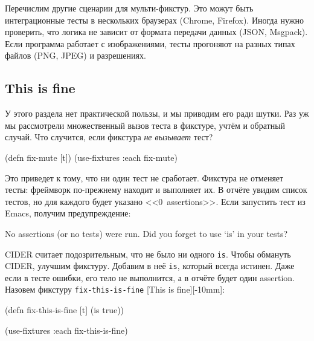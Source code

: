 Перечислим другие сценарии для мульти-фикстур. Это можут быть интеграционные
тесты в нескольких браузерах (Chrome, Firefox). Иногда нужно проверить, что
логика не зависит от формата передачи данных (JSON, Msgpack). Если программа
работает с изображениями, тесты прогоняют на разных типах файлов (PNG, JPEG) и
разрешениях.

\subsection{This is fine}

У этого раздела нет практической пользы, и мы приводим его ради шутки. Раз уж мы
рассмотрели множественный вызов теста в фикстуре, учтём и обратный случай. Что
случится, если фикстура \emph{не вызывает} тест?


\begin{english}
  \begin{clojure}
(defn fix-mute [t])
(use-fixtures :each fix-mute)
  \end{clojure}
\end{english}

Это приведет к тому, что ни один тест не сработает. Фикстура не отменяет тесты:
фреймворк по-прежнему находит и выполняет их. В отчёте увидим список тестов,
но для каждого будет указано <<0~assertions>>. Если запустить тест из Emacs,
получим предупреждение:

\begin{english}
  \begin{clojure}
No assertions (or no tests) were run.
Did you forget to use ‘is’ in your tests?
  \end{clojure}
\end{english}


CIDER считает подозрительным, что не было ни одного \verb|is|. Чтобы обмануть
CIDER, улучшим фикстуру. Добавим в неё \verb|is|, который всегда истинен. Даже
если в тесте ошибки, его тело не выполнится, а в отчёте будет один
assertion. Назовем фикстуру \verb|fix-this-is-fine|%
[This is fine][-10mm]:

\begin{english}
  \begin{clojure}
(defn fix-this-is-fine [t]
  (is true))

(use-fixtures :each fix-this-is-fine)
  \end{clojure}
\end{english}

